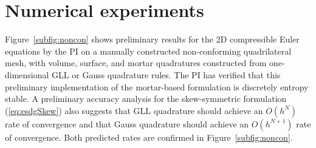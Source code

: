 \documentclass[review]{siamart0216}
\begin{document}
\section{Numerical experiments}

Figure~\ref{subfig:noncon} shows preliminary results for the 2D compressible Euler equations by the PI on a manually constructed non-conforming quadrilateral mesh, with volume, surface, and mortar quadratures constructed from one-dimensional GLL or Gauss quadrature rules.  The PI has verified that this preliminary implementation of the mortar-based formulation is discretely entropy stable.  A preliminary accuracy analysis for the skew-symmetric formulation (\ref{eq:esdgSkew}) also suggests that GLL quadrature should achieve an $O(h^N)$ rate of convergence and that Gauss quadrature should achieve an $O(h^{N+1})$ rate of convergence.  Both predicted rates are confirmed in Figure~\ref{subfig:noncon}.
\end{document}
